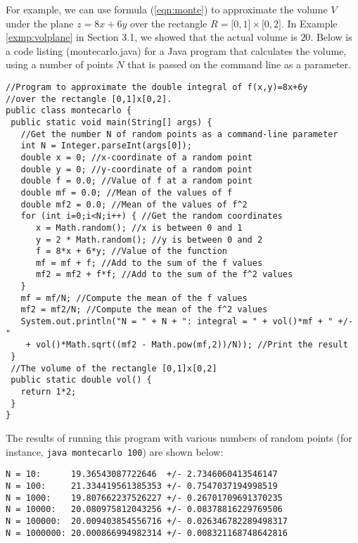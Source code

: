 For example, we can use formula (\ref{eqn:monte}) to approximate the volume $V$ under the plane $z=8x+6y$ over the
rectangle $R = \lbrack 0,1 \rbrack \times \lbrack 0,2 \rbrack$. In Example \ref{exmp:volplane} in Section 3.1, we showed
that the actual volume is $20$. Below is a code listing (montecarlo.java) for a Java program that calculates the volume,
using a number of points $N$ that is passed on the command line as a parameter.

\medskip
{}
\begin{lstlisting}
//Program to approximate the double integral of f(x,y)=8x+6y
//over the rectangle [0,1]x[0,2].
public class montecarlo {
 public static void main(String[] args) {
   //Get the number N of random points as a command-line parameter
   int N = Integer.parseInt(args[0]);
   double x = 0; //x-coordinate of a random point
   double y = 0; //y-coordinate of a random point
   double f = 0.0; //Value of f at a random point
   double mf = 0.0; //Mean of the values of f
   double mf2 = 0.0; //Mean of the values of f^2
   for (int i=0;i<N;i++) { //Get the random coordinates
      x = Math.random(); //x is between 0 and 1
      y = 2 * Math.random(); //y is between 0 and 2
      f = 8*x + 6*y; //Value of the function
      mf = mf + f; //Add to the sum of the f values
      mf2 = mf2 + f*f; //Add to the sum of the f^2 values
   }
   mf = mf/N; //Compute the mean of the f values
   mf2 = mf2/N; //Compute the mean of the f^2 values
   System.out.println("N = " + N + ": integral = " + vol()*mf + " +/- "
    + vol()*Math.sqrt((mf2 - Math.pow(mf,2))/N)); //Print the result
 }
 //The volume of the rectangle [0,1]x[0,2]
 public static double vol() {
   return 1*2;
 }
}
\end{lstlisting}
\medskip

The results of running this program with various numbers of random points 
(for instance, \texttt{java montecarlo 100}) 
are shown below:

\begin{verbatim}
N = 10:      19.36543087722646  +/- 2.7346060413546147
N = 100:     21.334419561385353 +/- 0.7547037194998519
N = 1000:    19.807662237526227 +/- 0.26701709691370235
N = 10000:   20.080975812043256 +/- 0.08378816229769506
N = 100000:  20.009403854556716 +/- 0.026346782289498317
N = 1000000: 20.000866994982314 +/- 0.008321168748642816
\end{verbatim}

